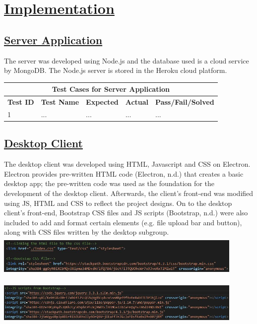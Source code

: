 \documentclass{article}
\begin{document}
\section{\underline{Implementation}}
\subsection{\underline{Server Application}}
The server was developed using Node.js and the database used is a cloud service by MongoDB. The Node.js server is stored in the Heroku cloud platform.

\begin{tabular}{|p{2cm}|p{2cm}|p{3cm}|p{3cm}|p{3cm}|}
\hline
\multicolumn{5}{|c|}{\textbf{Test Cases for Server Application}} \\
\hline
\textbf{Test ID} & \textbf{Test Name} & \textbf{Expected} & \textbf{Actual} & \textbf{Pass/Fail/Solved} \\
\hline
1 & ... & ... & ... & ... \\
\hline
\end{tabular}

\subsection{\underline{Desktop Client}}
The desktop client was developed using  HTML, Javascript and CSS on Electron. Electron provides pre-written HTML code (Electron, n.d.) that creates a basic desktop app; the pre-written code was used as the foundation for the development of the desktop client. Afterwards, the client's front-end was modified using JS, HTML and CSS to reflect the project designs. On to the desktop client's front-end, Bootstrap CSS files and JS scripts (Bootstrap, n.d.) were also included to add and format certain elements (e.g. file upload bar and button), along with CSS files written by the desktop subgroup.
\includegraphics[width=12cm, height=2cm]{BootstrapCSSfiles}

\includegraphics[width=12cm, height=2cm]{BootstrapJSscripts}
\end{document}
